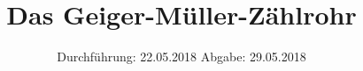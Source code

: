 

\subject{703}
\title{Das Geiger-Müller-Zählrohr}
\date{%
  Durchführung: 22.05.2018
  \hspace{3em}
  Abgabe: 29.05.2018
}



\maketitle
\thispagestyle{empty}
\tableofcontents
\newpage






\printbibliography{}


